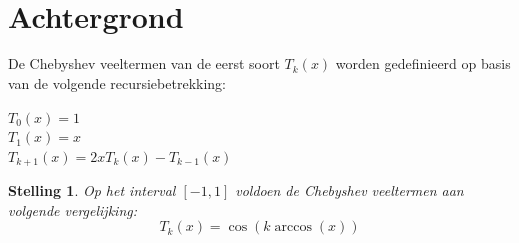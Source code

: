 \documentclass{article}
\title{
\vspace{2in}
\textmd{\textbf{ \hmwkTitle}}\\
\vspace{0.1in}\normalsize\vspace{0.1in} \large{\hmwkSubject}\\
\vspace{3in}
}
\author{\textbf{\hmwkAuthorName}\ \\ \textbf{\hmwkAuthorNameS}\ }
\date{} %
\newtheorem{stelling}{Stelling}
\begin{document}
\maketitle



\newpage
\tableofcontents
\newpage



\section{Achtergrond}

De Chebyshev veeltermen van de eerst soort $T_{k}(x)$ worden gedefinieerd op basis van de volgende recursiebetrekking:
\begin{center}
$T_{0}(x)=1$\\
$T_{1}(x)=x$\\
$T_{k+1}(x)=2xT_{k}(x)-T_{k-1}(x)$
\end{center}

\begin{stelling}
Op het interval $[-1,1]$ voldoen de Chebyshev veeltermen aan volgende vergelijking:
\begin{equation}
T_{k}(x)=\cos(k\arccos(x)) \label{formule1}
\end{equation}
\end{stelling}
\end{document}
